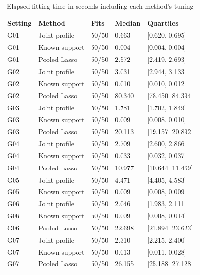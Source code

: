 
\begin{longtable}[t]{lllll}
\caption{\label{tab:registered-computation-time}Elapsed fitting time in seconds including each method's tuning}\\
\toprule
Setting & Method & Fits & Median & Quartiles\\
\midrule
G01 & Joint profile & 50/50 & 0.663 & {}[0.620, 0.695]\\
G01 & Known support & 50/50 & 0.004 & {}[0.004, 0.004]\\
G01 & Pooled Lasso & 50/50 & 2.572 & {}[2.419, 2.693]\\
G02 & Joint profile & 50/50 & 3.031 & {}[2.944, 3.133]\\
G02 & Known support & 50/50 & 0.010 & {}[0.010, 0.012]\\
G02 & Pooled Lasso & 50/50 & 80.340 & {}[78.450, 84.394]\\
G03 & Joint profile & 50/50 & 1.781 & {}[1.702, 1.849]\\
G03 & Known support & 50/50 & 0.009 & {}[0.008, 0.010]\\
G03 & Pooled Lasso & 50/50 & 20.113 & {}[19.157, 20.892]\\
G04 & Joint profile & 50/50 & 2.709 & {}[2.600, 2.866]\\
G04 & Known support & 50/50 & 0.033 & {}[0.032, 0.037]\\
G04 & Pooled Lasso & 50/50 & 10.977 & {}[10.644, 11.469]\\
G05 & Joint profile & 50/50 & 4.471 & {}[4.405, 4.583]\\
G05 & Known support & 50/50 & 0.009 & {}[0.008, 0.009]\\
G06 & Joint profile & 50/50 & 2.046 & {}[1.983, 2.111]\\
G06 & Known support & 50/50 & 0.009 & {}[0.008, 0.014]\\
G06 & Pooled Lasso & 50/50 & 22.698 & {}[21.894, 23.623]\\
G07 & Joint profile & 50/50 & 2.310 & {}[2.215, 2.400]\\
G07 & Known support & 50/50 & 0.013 & {}[0.011, 0.028]\\
G07 & Pooled Lasso & 50/50 & 26.155 & {}[25.188, 27.128]\\
\bottomrule
\end{longtable}
